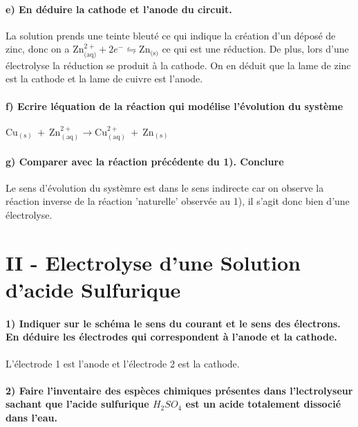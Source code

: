 \documentclass[a4paper, 12pt]{scrartcl}
\begin{document}
\paragraph*{e) En déduire la cathode et l'anode du circuit. \\[5mm]}

La solution prends une teinte bleuté ce qui indique la création d'un déposé de zinc, donc on a 
$\text{Zn}^{2+}_{\text{(aq)}} + 2e^- \leftrightharpoons \text{Zn}_{\text{(s)}}$ ce qui est une réduction. 
De plus, lors d'une électrolyse la réduction se produit à la cathode. On en déduit que la lame de zinc est la cathode et la lame de cuivre est l'anode.

\paragraph*{f) Ecrire léquation de la réaction qui modélise l'évolution du système \\[5mm]}

$\text{Cu}_{(\text{s})}\ +\ \text{Zn}^{2+}_{(\text{aq})} \longrightarrow \text{Cu}^{2+}_{(\text{aq})}\ +\ \text{Zn}_{(\text{s})}$

\paragraph*{g) Comparer avec la réaction précédente du 1). Conclure \\[5mm]}

Le sens d'évolution du systèmre est dans le sens indirecte car on observe la réaction inverse de la réaction 'naturelle' observée au 1), 
il s'agit donc bien d'une électrolyse.



\section*{II - Electrolyse d'une Solution d'acide Sulfurique}
\paragraph*{1) Indiquer sur le schéma le sens du courant et le sens des électrons. En déduire les électrodes qui correspondent à l'anode et la cathode. \\[5mm]}

L'électrode 1 est l'anode et l'électrode 2 est la cathode. 

\paragraph*{2) Faire l'inventaire des espèces chimiques présentes dans l'lectrolyseur sachant que l'acide sulfurique $H_2SO_4$ est un acide totalement dissocié dans l'eau. \\[5mm]}
\end{document}
